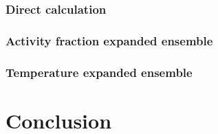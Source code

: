\documentclass[twoside]{article}
\begin{document}
\begin{multicols}{2}
\subsubsection{Direct calculation}
\subsubsection{Activity fraction expanded ensemble}
\subsubsection{Temperature expanded ensemble}


\section{Conclusion}



\begin{thebibliography}{99} %


 
\end{thebibliography}


\end{multicols}
\end{document}
